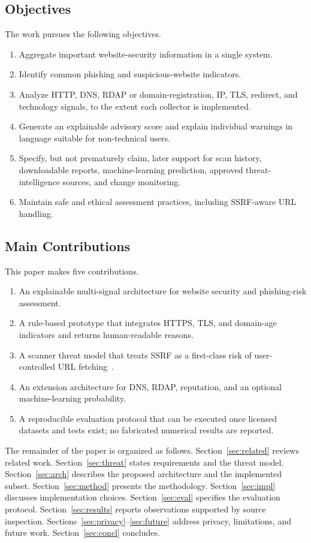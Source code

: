 \documentclass[conference]{IEEEtran}
\begin{document}
\subsection{Objectives}
The work pursues the following objectives.
\begin{enumerate}
  \item Aggregate important website-security information in a single system.
  \item Identify common phishing and suspicious-website indicators.
  \item Analyze HTTP, DNS, RDAP or domain-registration, IP, TLS, redirect, and technology signals, to the extent each collector is implemented.
  \item Generate an explainable advisory score and explain individual warnings in language suitable for non-technical users.
  \item Specify, but not prematurely claim, later support for scan history, downloadable reports, machine-learning prediction, approved threat-intelligence sources, and change monitoring.
  \item Maintain safe and ethical assessment practices, including SSRF-aware URL handling.
\end{enumerate}

\subsection{Main Contributions}
This paper makes five contributions.
\begin{enumerate}
  \item An explainable multi-signal architecture for website security and phishing-risk assessment.
  \item A rule-based prototype that integrates HTTPS, TLS, and domain-age indicators and returns human-readable reasons.
  \item A scanner threat model that treats SSRF as a first-class risk of user-controlled URL fetching~\cite{owaspssrf,owasp2021top10}.
  \item An extension architecture for DNS, RDAP, reputation, and an optional machine-learning probability.
  \item A reproducible evaluation protocol that can be executed once licensed datasets and tests exist; no fabricated numerical results are reported.
\end{enumerate}

The remainder of the paper is organized as follows. Section~\ref{sec:related} reviews related work. Section~\ref{sec:threat} states requirements and the threat model. Section~\ref{sec:arch} describes the proposed architecture and the implemented subset. Section~\ref{sec:method} presents the methodology. Section~\ref{sec:impl} discusses implementation choices. Section~\ref{sec:eval} specifies the evaluation protocol. Section~\ref{sec:results} reports observations supported by source inspection. Sections~\ref{sec:privacy}--\ref{sec:future} address privacy, limitations, and future work. Section~\ref{sec:concl} concludes.
\end{document}
